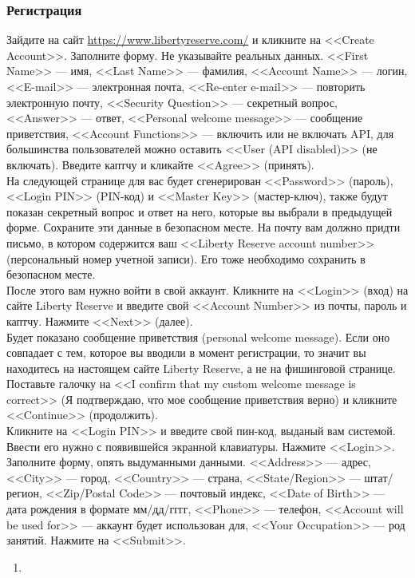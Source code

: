 \begin{enumerate}
\subsubsection{Регистрация}
Зайдите на сайт \url{https://www.libertyreserve.com/} и кликните на <<Create Account>>. Заполните форму. Не указывайте реальных данных. <<First Name>> --- имя, <<Last Name>> --- фамилия, <<Account Name>> --- логин, <<E-mail>> --- электронная почта, <<Re-enter e-mail>> --- повторить электронную почту, <<Security Question>> --- секретный вопрос, <<Answer>> --- ответ, <<Personal welcome message>> --- сообщение приветствия, <<Account Functions>> --- включить или не включать API, для большинства пользователей можно оставить <<User (API disabled)>> (не включать). Введите каптчу и кликайте <<Agree>> (принять).\\
На следующей странице для вас будет сгенерирован <<Password>> (пароль), <<Login PIN>> (PIN-код) и <<Master Key>> (мастер-ключ), также будут показан секретный вопрос и ответ на него, которые вы выбрали в предыдущей форме. Сохраните эти данные в безопасном месте. На почту вам должно придти письмо, в котором содержится ваш <<Liberty Reserve account number>> (персональный номер учетной записи). Его тоже необходимо сохранить в безопасном месте.\\
После этого вам нужно войти в свой аккаунт. Кликните на <<Login>> (вход) на сайте Liberty Reserve и введите свой <<Account Number>> из почты, пароль и каптчу. Нажмите <<Next>> (далее).\\
Будет показано сообщение приветствия (personal welcome message). Если оно совпадает с тем, которое вы вводили в момент регистрации, то значит вы находитесь на настоящем сайте Liberty Reserve, а не на фишинговой странице. Поставьте галочку на <<I confirm that my custom welcome message is correct>> (Я подтверждаю, что мое сообщение приветствия верно) и кликните <<Continue>> (продолжить).\\
Кликните на <<Login PIN>> и введите свой пин-код, выданый вам системой. Ввести его нужно с появившейся экранной клавиатуры. Нажмите <<Login>>.\\
Заполните форму, опять выдуманными данными. <<Address>> --- адрес, <<City>> --- город, <<Country>> --- страна, <<State/Region>> --- штат/регион, <<Zip/Postal Code>> --- почтовый индекс, <<Date of Birth>> --- дата рождения в формате мм/дд/гггг, <<Phone>> --- телефон, <<Account will be used for>> --- аккаунт будет использован для, <<Your Occupation>> --- род занятий. Нажмите на <<Submit>>.
\begin{enumerate}
\item 
\end{enumerate}


\end{enumerate}
